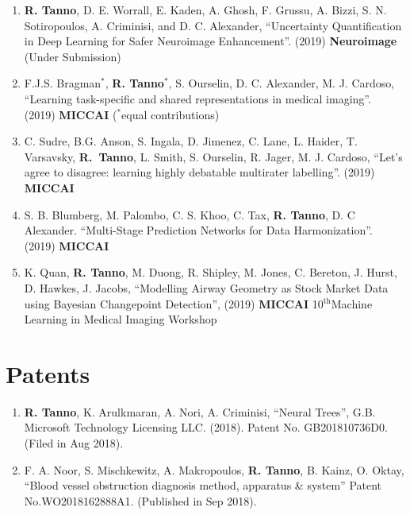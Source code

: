 \begin{enumerate}
	\item \textbf{R. Tanno}, D. E. Worrall, E. Kaden, A. Ghosh, F. Grussu, A. Bizzi, S. N. Sotiropoulos, A. Criminisi, and D. C. Alexander, ``Uncertainty Quantification in Deep Learning for Safer Neuroimage Enhancement''. (2019) \textbf{Neuroimage} (Under Submission)
	
	\item F.J.S. Bragman$^*$, \textbf{R. Tanno}$^*$, S. Ourselin, D. C. Alexander, M. J. Cardoso, ``Learning task-specific and shared representations in medical imaging''.  (2019) \textbf{MICCAI} ($^*$equal contributions)
	
	\item C. Sudre, B.G. Anson, S. Ingala, D. Jimenez, C. Lane, L. Haider, T. Varsavsky,  \textbf{R.~Tanno}, L. Smith, S. Ourselin, R. Jager, M. J. Cardoso, ``Let's agree to disagree: learning highly debatable multirater labelling''.  (2019) \textbf{MICCAI} 
	
	\item S. B. Blumberg, M. Palombo, C. S. Khoo, C. Tax, \textbf{R. Tanno}, D. C Alexander. “Multi-Stage Prediction Networks for Data Harmonization”. (2019) \textbf{MICCAI }
	
	\item K. Quan, \textbf{R. Tanno}, M. Duong, R. Shipley, M. Jones, C. Bereton, J. Hurst, D. Hawkes, J. Jacobs, 	``Modelling Airway Geometry as Stock Market Data using Bayesian Changepoint Detection'', (2019) \textbf{MICCAI} 10$^{\text{th}}$Machine Learning in Medical Imaging Workshop
	
\end{enumerate}

\section*{Patents}
\begin{enumerate}
	\item  \textbf{R. Tanno}, K. Arulkmaran, A. Nori, A. Criminisi, “Neural Trees”, G.B. Microsoft Technology Licensing LLC. (2018). Patent No. GB201810736D0. (Filed in Aug 2018).
	\item F. A. Noor, S. Mischkewitz, A. Makropoulos, \textbf{R. Tanno}, B. Kainz, O. Oktay, “Blood vessel obstruction diagnosis method, apparatus \& system”  Patent No.WO2018162888A1. (Published in Sep 2018).
	
\end{enumerate}



